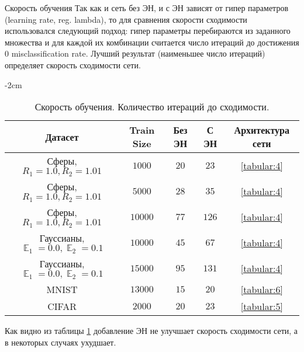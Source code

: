 \documentclass[a4paper,12pt,titlepage,finall]{article}
\DeclareMathOperator*{\EE}{\mathbb{E}}
\begin{document}
\begin{section}{Скорость обучения}
	Так как и сеть без ЭН, и с ЭН зависят от гипер параметров (learning rate, reg. lambda), то для сравнения скорости сходимости использовался следующий подход: гипер параметры перебираются из заданного множества и для каждой их комбинации считается число итераций до достижения 0 misclassification rate. Лучший результат (наименьшее число итераций) определяет скорость сходимости сети.
\begin{table}[H]
	\begin{center}
		\addtolength{\leftskip} {-2cm}
		\addtolength{\rightskip}{-2cm}
		\begin{tabular}{c|c|c|c|c}
			Датасет & Train Size & Без ЭН & С ЭН & Архитектура сети\\
			\hline
			Сферы, $R_{1}=1.0, R_{2}=1.01$         & $1000$   & $20$   & $23$     & \ref{tabular:4} \\
			Сферы, $R_{1}=1.0, R_{2}=1.01$         & $5000$   & $28$   & $35$     & \ref{tabular:4} \\
			Сферы, $R_{1}=1.0, R_{2}=1.01$         & $10000$  & $77$   & $126$    & \ref{tabular:4} \\
			Гауссианы, $\EE_{1}=0.0, \EE_{2}=0.1$  & $10000$  & $45$   & $67$     & \ref{tabular:4} \\
			Гауссианы, $\EE_{1}=0.0, \EE_{2}=0.1$  & $15000$  & $95$   & $131$    & \ref{tabular:4} \\
			MNIST                                  & $13000$  & $15$   & $20$     & \ref{tabular:6} \\
			CIFAR                                  & $2000$   & $20$   & $23$     & \ref{tabular:5} \\
		\end{tabular}
		\caption{\label{tabular:2} Скорость обучения. Количество итераций до сходимости.}
	\end{center}
\end{table}
	Как видно из таблицы \ref{tabular:2} добавление ЭН не улучшает скорость сходимости сети, а в некоторых случаях ухудшает.
\end{section}
\end{document}
